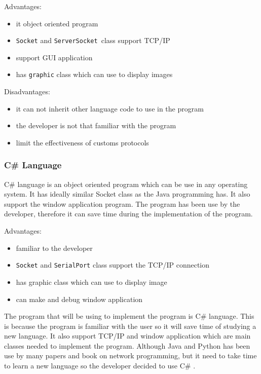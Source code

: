 Advantages:
\begin{itemize}
\item it object oriented program 
\item \texttt{Socket} and \texttt{ServerSocket }class support TCP/IP
\item support GUI application
\item has \texttt{graphic} class which can use to display images
\end{itemize}

Disadvantages:
\begin{itemize}
\item it can not inherit other language code to use in the program
\item the developer is not that familiar with the program
\item limit the effectiveness of customs protocols \cite{elliotH}
\end{itemize}

\subsubsection*{C\# Language}
C\# language is an object oriented program which can be use in any operating system.
It has ideally similar Socket class as the Java programming has. 
It also support the window application program.
The program has been use by the developer, therefore it can save time during the implementation of the program.

Advantages:
\begin{itemize}
\item familiar to the developer
\item \texttt{Socket} and \texttt{SerialPort} class support the TCP/IP connection
\item has graphic class which can use to display image
\item can make and debug window application 
\end{itemize}


The program that will be using to implement the program is C\# language. 
This is because the program is familiar with the user so it will save time of studying a new language.
It also support TCP/IP and window application which are main classes needed to implement the program.
Although Java and Python has been use by many papers and book on network programming, but it need to take time to learn a new language so the developer decided to use C\# \cite{normanM,guidoR,kennethC,elliotH}.

